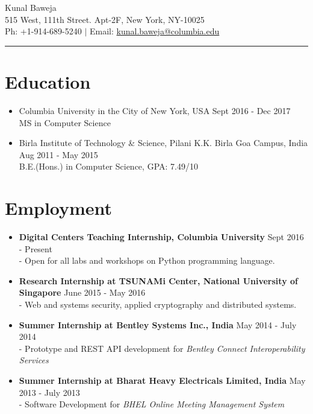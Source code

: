 \documentclass{article}
\def\name{Kunal Baweja}
\begin{document}
\begin{center}
{\huge \name}\\
515 West, 111th Street. Apt-2F, New York, NY-10025\\
\vspace{2pt}
Ph: +1-914-689-5240 $|$ Email: \hspace{3pt}\href{mailto:kunal.baweja@columbia.edu}{kunal.baweja@columbia.edu}
\end{center}

\hrule
\vspace{5pt}

\section*{Education}
\begin{itemize}
    
    \item Columbia University in the City of New York, USA {\hfill Sept 2016 - Dec 2017}\\
    MS in Computer Science
    
    \item Birla Institute of Technology \& Science, Pilani K.K. Birla Goa Campus, India {\hfill Aug 2011 - May 2015}\\
    B.E.(Hons.) in Computer Science, GPA: 7.49/10

\end{itemize}


\section*{Employment}
\begin{itemize}
    \item \textbf{Digital Centers Teaching Internship, Columbia University} {\hfill Sept 2016 - Present}\\
    - Open for all labs and workshops on Python programming language.

    \item \textbf{Research Internship at TSUNAMi Center, National University of Singapore} {\hfill June 2015 - May 2016}\\
    - Web and systems security, applied cryptography and distributed systems.
    
    \item \textbf{Summer Internship at Bentley Systems Inc., India} {\hfill May 2014 - July 2014}\\
    - Prototype and REST API development for \textit{Bentley Connect Interoperability Services}

    \item \textbf{Summer Internship at Bharat Heavy Electricals Limited, India} {\hfill May 2013 - July 2013}\\
    - Software Development for \textit{BHEL Online Meeting Management System}
\end{itemize}
\end{document}
